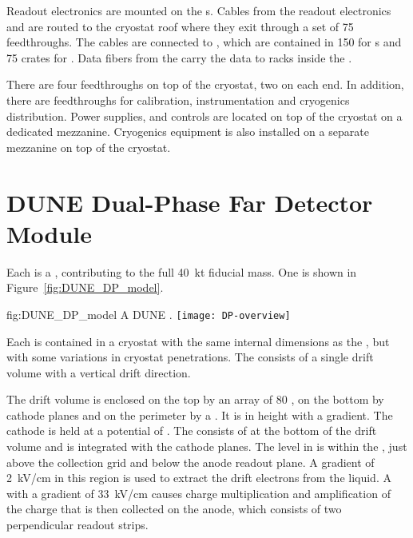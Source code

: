 Readout electronics are mounted on the s. Cables from the
readout electronics and  are routed to the cryostat roof
where they exit through a set of \num{75} feedthroughs. The cables are
connected to , which are contained in \num{150}
 for s and \num{75} crates for . Data
fibers from the  carry the data to  racks
inside the .

There are four  feedthroughs on top of the cryostat, two on
each end. In addition, there are feedthroughs for calibration,
instrumentation and cryogenics distribution. Power supplies, and
controls are located on top of the cryostat on a dedicated
mezzanine. Cryogenics equipment is also installed on a separate
mezzanine on top of the cryostat.

\section{DUNE Dual-Phase Far Detector Module}
\label{sec:fdsp-DP-module}

Each  is a \nominalmodsize {}, contributing
to the full \SI{40}{\kilo\tonne}  fiducial mass.  One
\nominalmodsize {} is shown in
Figure~\ref{fig:DUNE_DP_model}.
\begin{dunefigure}{fig:DUNE_DP_model} {A \nominalmodsize DUNE   .}
  \texttt{[image: DP-overview]}
\end{dunefigure} 

Each  is contained in a cryostat with the same internal
dimensions as the , but with some variations in cryostat
penetrations.  The  consists of a single drift volume
with a vertical drift direction.

The drift volume is enclosed on the top by an array of \num{80}
, on the bottom by cathode planes and on the perimeter by
a . It is \dpmaxdrift in height with a \dpnominaldriftfield
gradient. The cathode is held at a potential of
\dptargetdriftvoltneg{}.  The   consists of
\dpnumpmtch {} at the bottom of the drift volume and is
integrated with the cathode planes.  The  level in
 is within the , just above the collection
grid and below the anode readout plane. A gradient of
\SI{2}{\kilo\volt/\centi\meter} in this region is used to extract the
drift electrons from the liquid. A  with a gradient of
\SI{33}{\kilo\volt/\centi\meter} causes charge multiplication and
amplification of the charge that is then collected on the anode, 
which consists of two perpendicular %
readout strips.

